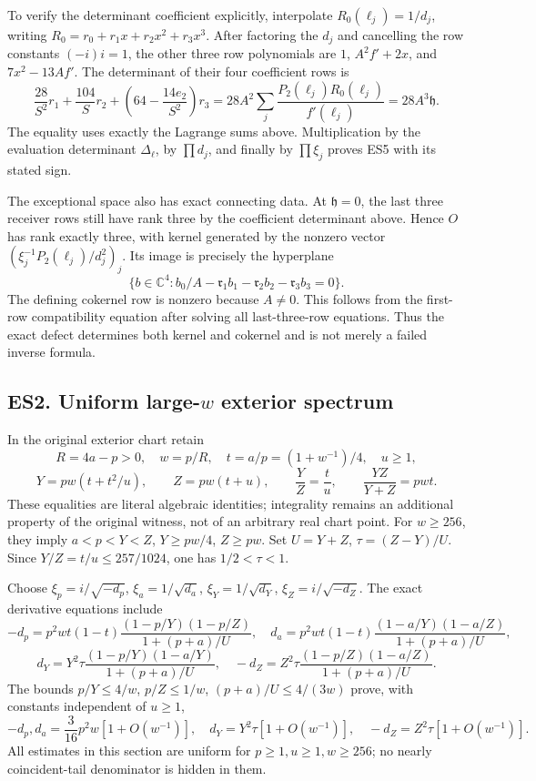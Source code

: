 To verify the determinant coefficient explicitly, interpolate \(R_0(\ell_j)=1/d_j\), writing \(R_0=r_0+r_1x+r_2x^2+r_3x^3\). After factoring the \(d_j\) and cancelling the row constants \((-i)i=1\), the other three row polynomials are \(1\), \(A^2f'+2x\), and \(7x^2-13Af'\). The determinant of their four coefficient rows is \[
\frac{28}{S^2}r_1+\frac{104}{S}r_2+
\left(64-\frac{14e_2}{S^2}\right)r_3
=28A^2\sum_j\frac{P_2(\ell_j)R_0(\ell_j)}{f'(\ell_j)}
=28A^3\mathfrak h.
\] The equality uses exactly the Lagrange sums above. Multiplication by the evaluation determinant \(\Delta_\ell\), by \(\prod d_j\), and finally by \(\prod\xi_j\) proves ES5 with its stated sign.

The exceptional space also has exact connecting data. At \(\mathfrak h=0\), the last three receiver rows still have rank three by the coefficient determinant above. Hence \(O\) has rank exactly three, with kernel generated by the nonzero vector \((\xi_j^{-1}P_2(\ell_j)/d_j^2)_j\). Its image is precisely the hyperplane \[
\{b\in\mathbb C^4:b_0/A-\mathfrak r_1b_1-\mathfrak r_2b_2-\mathfrak r_3b_3=0\}.
\] The defining cokernel row is nonzero because \(A\ne0\). This follows from the first-row compatibility equation after solving all last-three-row equations. Thus the exact defect determines both kernel and cokernel and is not merely a failed inverse formula.

\subsection{\texorpdfstring{ES2. Uniform large-\(w\) exterior spectrum}{ES2. Uniform large-w exterior spectrum}}\label{es2.-uniform-large-w-exterior-spectrum}

In the original exterior chart retain \[
R=4a-p>0,\quad w=p/R,\quad t=a/p=(1+w^{-1})/4,\quad u\ge1,
\] \[
Y=pw(t+t^2/u),\qquad Z=pw(t+u),\qquad
\frac YZ=\frac tu,\qquad\frac{YZ}{Y+Z}=pwt.
\tag{ES6}
\] These equalities are literal algebraic identities; integrality remains an additional property of the original witness, not of an arbitrary real chart point. For \(w\ge256\), they imply \(a<p<Y<Z\), \(Y\ge pw/4\), \(Z\ge pw\). Set \(U=Y+Z\), \(\tau=(Z-Y)/U\). Since \(Y/Z=t/u\le257/1024\), one has \(1/2<\tau<1\).

Choose \(\xi_p=i/\sqrt{-d_p}\), \(\xi_a=1/\sqrt{d_a}\), \(\xi_Y=1/\sqrt{d_Y}\), \(\xi_Z=i/\sqrt{-d_Z}\). The exact derivative equations include \[
-d_p=p^2wt(1-t)\frac{(1-p/Y)(1-p/Z)}{1+(p+a)/U},\quad
d_a=p^2wt(1-t)\frac{(1-a/Y)(1-a/Z)}{1+(p+a)/U},
\] \[
d_Y=Y^2\tau\frac{(1-p/Y)(1-a/Y)}{1+(p+a)/U},\quad
-d_Z=Z^2\tau\frac{(1-p/Z)(1-a/Z)}{1+(p+a)/U}.
\tag{ES7}
\] The bounds \(p/Y\le4/w\), \(p/Z\le1/w\), \((p+a)/U\le4/(3w)\) prove, with constants independent of \(u\ge1\), \[
-d_p,d_a=\frac3{16}p^2w[1+O(w^{-1})],\quad
d_Y=Y^2\tau[1+O(w^{-1})],\quad-d_Z=Z^2\tau[1+O(w^{-1})].
\tag{ES8}
\] All estimates in this section are uniform for \(p\ge1,u\ge1,w\ge256\); no nearly coincident-tail denominator is hidden in them.

